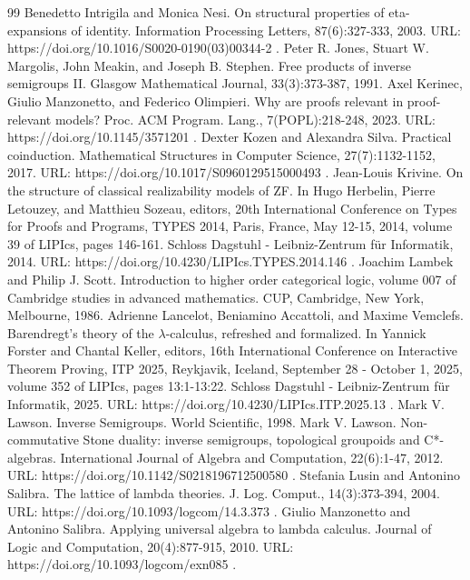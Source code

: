 \documentclass[10pt,a4paper]{amsart}
\begin{document}
\begin{thebibliography}{99}
 Benedetto Intrigila and Monica Nesi. On structural properties of eta-expansions of identity. Information Processing Letters, 87(6):327-333, 2003. URL: https://doi.org/10.1016/S0020-0190(03)00344-2 .
 Peter R. Jones, Stuart W. Margolis, John Meakin, and Joseph B. Stephen. Free products of inverse semigroups II. Glasgow Mathematical Journal, 33(3):373-387, 1991.
 Axel Kerinec, Giulio Manzonetto, and Federico Olimpieri. Why are proofs relevant in proof-relevant models? Proc. ACM Program. Lang., 7(POPL):218-248, 2023. URL: https://doi.org/10.1145/3571201 .
 Dexter Kozen and Alexandra Silva. Practical coinduction. Mathematical Structures in Computer Science, 27(7):1132-1152, 2017. URL: https://doi.org/10.1017/S0960129515000493 .
 Jean-Louis Krivine. On the structure of classical realizability models of ZF. In Hugo Herbelin, Pierre Letouzey, and Matthieu Sozeau, editors, 20th International Conference on Types for Proofs and Programs, TYPES 2014, Paris, France, May 12-15, 2014, volume 39 of LIPIcs, pages 146-161. Schloss Dagstuhl - Leibniz-Zentrum für Informatik, 2014. URL: https://doi.org/10.4230/LIPIcs.TYPES.2014.146 .
 Joachim Lambek and Philip J. Scott. Introduction to higher order categorical logic, volume 007 of Cambridge studies in advanced mathematics. CUP, Cambridge, New York, Melbourne, 1986.
 Adrienne Lancelot, Beniamino Accattoli, and Maxime Vemclefs. Barendregt’s theory of the \ensuremath{\lambda}-calculus, refreshed and formalized. In Yannick Forster and Chantal Keller, editors, 16th International Conference on Interactive Theorem Proving, ITP 2025, Reykjavik, Iceland, September 28 - October 1, 2025, volume 352 of LIPIcs, pages 13:1-13:22. Schloss Dagstuhl - Leibniz-Zentrum für Informatik, 2025. URL: https://doi.org/10.4230/LIPIcs.ITP.2025.13 .
 Mark V. Lawson. Inverse Semigroups. World Scientific, 1998.
 Mark V. Lawson. Non-commutative Stone duality: inverse semigroups, topological groupoids and C*-algebras. International Journal of Algebra and Computation, 22(6):1-47, 2012. URL: https://doi.org/10.1142/S0218196712500580 .
 Stefania Lusin and Antonino Salibra. The lattice of lambda theories. J. Log. Comput., 14(3):373-394, 2004. URL: https://doi.org/10.1093/logcom/14.3.373 .
 Giulio Manzonetto and Antonino Salibra. Applying universal algebra to lambda calculus. Journal of Logic and Computation, 20(4):877-915, 2010. URL: https://doi.org/10.1093/logcom/exn085 .

\end{thebibliography}
\end{document}
